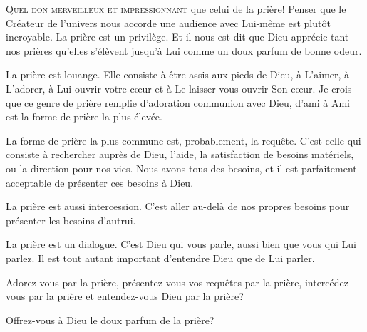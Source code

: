 

\lettrine{Q}{uel don merveilleux et impressionnant} que celui de la prière!
 Penser que le Créateur de l'univers nous accorde une audience avec Lui-même
 est plutôt incroyable. La prière est un privilège.
 Et il nous est dit que Dieu apprécie tant nos prières qu'elles s'élèvent
 jusqu'à Lui comme un doux parfum de bonne odeur.

La prière est louange. 
 Elle consiste à être assis aux pieds de Dieu, à L'aimer, à L'adorer,
 à Lui ouvrir votre c\oe{}ur et à Le laisser vous ouvrir Son c\oe{}ur.
 Je crois que ce genre de prière remplie d'adoration
 \ocadr communion avec Dieu, d'ami à Ami \fcadr{}
 est la forme de prière la plus élevée.


La forme de prière la plus commune est, probablement, la requête.
 C'est celle qui consiste à rechercher auprès de Dieu, 
 l'aide, la satisfaction de besoins matériels, ou la direction pour nos vies.
 Nous avons tous des besoins, et il est parfaitement acceptable
 de présenter ces besoins à Dieu.

La prière est aussi intercession. 
 C'est aller au-delà de nos propres besoins pour présenter les besoins d'autrui.

La prière est un dialogue. C'est Dieu qui vous parle,
 aussi bien que vous qui Lui parlez.
 Il est tout autant 
 important d'entendre Dieu que de Lui parler.

Adorez-vous par la prière, présentez-vous vos requêtes par la prière,
 intercédez-vous par la prière et entendez-vous Dieu par la prière?

Offrez-vous à Dieu le doux parfum de la prière?

\dvrule




